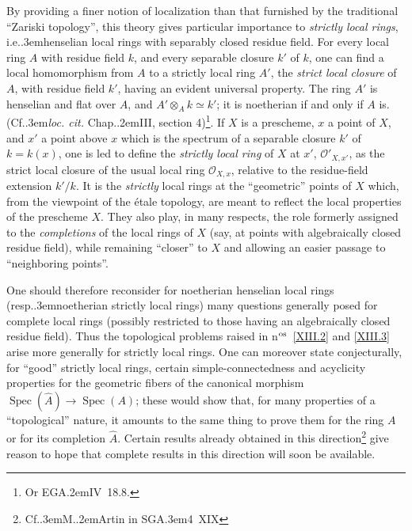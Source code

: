 \documentclass[11pt,a4paper,oneside]{book}
\providecommand{\sisi}[2]{#2}
\providecommand{\pageoriginale}{%
  \refstepcounter{pageoriginal}%
  \marginpar{\raggedright\footnotesize\bfseries\thepageoriginal}%
  \xspace}
\providecommand{\sfootnote}[1]{\footnote{#1}}
\providecommand{\og}{``}
\providecommand{\fg}{''\xspace}
\providecommand{\Cf}{Cf.\kern.3em}
\providecommand{\ie}{i.e.\kern.3em}
\providecommand{\resp}{resp.\kern.3em}
\providecommand{\loccit}{\textit{loc. cit.}\xspace}
\providecommand{\EGA}{\textup{EGA}\kern.2em}
\providecommand{\SGA}{\textup{SGA}\kern.3em}
\providecommand{\ptbl}{.\kern.2em}
\providecommand{\Oo}{\mathcal O}
\providecommand{\OXx}{\mathcal O_{X,x}}
\providecommand{\Spec}{\operatorname{Spec}}
\theoremstyle{plain}
\theoremstyle{definition}
\theoremstyle{remark}
\renewcommand{\Ref}[1]{\textup{\ref{#1}}}
\begin{document}
By providing a finer notion of localization than that furnished by the traditional \og Zariski topology\fg, this theory gives particular importance to \emph{strictly local rings}\label{pXIII.6}, \ie henselian local rings with separably closed residue field. For every local ring $A$ with residue field $k$, and every separable closure $k'$ of $k$, one can find a local homomorphism from $A$ to a strictly local ring $A'$, the \emph{strict local closure} of $A$, with residue field $k'$, having an evident universal property. The ring $A'$ is henselian and flat over $A$, and $A'\otimes_A k\simeq k'$; it is noetherian if and only if $A$ is. (\Cf \loccit Chap\ptbl III, section 4)\sfootnote{Or \EGA IV~18.8.}. If $X$ is a prescheme, $x$ a point of $X$, and $x'$ a point above $x$ which is the spectrum of a separable closure $k'$ of $k=k(x)$, one is led to define the \emph{strictly local ring} of $X$ at $x'$, $\Oo'_{X,x'}$, as the strict local closure of the usual local ring $\OXx$, relative to the residue-field extension $\sisi{K'/K}{k'/k}$. It is the \emph{strictly} local rings at the \og geometric\fg points of $X$ which, from the viewpoint of the \'etale topology, are meant to reflect the local properties of the prescheme $X$. They also play, in many respects, the role formerly assigned to the \emph{completions} of the local rings of $X$ (say, at points with algebraically closed residue field), while remaining \og closer\fg to $X$ and allowing an easier passage to \og neighboring points\fg.

One should therefore reconsider for noetherian henselian local rings (\resp noetherian strictly local rings) many questions generally posed for complete local rings (possibly restricted\pageoriginale to those having an algebraically closed residue field). Thus the topological problems raised in n$^{\textup{os}}$~\Ref{XIII.2} and \Ref{XIII.3} arise more generally for strictly local rings. One can moreover state conjecturally, for \og good\fg strictly local rings, certain simple-connectedness and acyclicity properties for the geometric fibers of the canonical morphism $\Spec(\widehat{A})\to\Spec(A)$; these would show that, for many properties of a \og topological\fg nature, it amounts to the same thing to prove them for the ring $A$ or for its completion $\widehat{A}$. Certain results already obtained in this direction\sfootnote{\Cf M\ptbl\sisi{ARTIN}{Artin} in \SGA 4~XIX} give reason to hope that complete results in this direction will soon be available.
\end{document}
